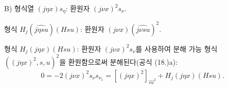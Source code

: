 
B) 형식열 $(j\eta x)s_\eta$: 환원자 $(j\nu x)^2s_\nu$.

형식 $H_j(\widehat{j\eta su})(Hsu)$: 환원자 $(j\nu x)(\widehat{j\nu su})^2$.

형식 $H_j(j\eta x)(Hsu)$: 환원자 $(j\nu x)^2s_\nu$를 사용하여 분해 가능 형식 $((j\eta x)^2,s,u)^2$을 환원함으로써 분해된다(공식 (18.)a):
\[
0=-2(j\nu x)^2s_\nu s_{\nu_1}=[(j\eta x)^2]_{\widehat{su}^2}+H_j(j\eta x)(Hsu).
\]
